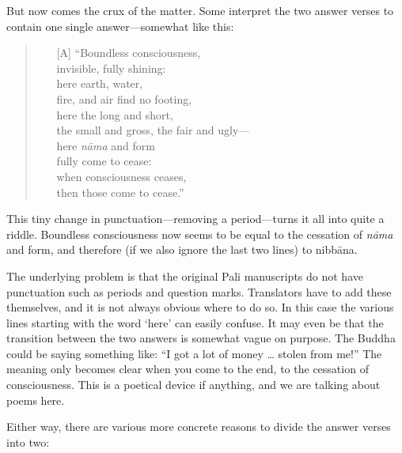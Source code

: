 \documentclass[10pt, openright]{book}
\begin{document}
\vspace* {1em}\noindent
But now comes the crux of the matter. Some interpret the two answer verses to contain one single answer—somewhat like this:


\begin{quote}


\begin{itemize}

\item[{[A]}]“Boundless consciousness, \\ invisible, fully shining: \\ here earth, water, \\ fire, and air find no footing, \\ here the long and short, \\ the small and gross, the fair and ugly— \\ here \textit{nāma} and form \\ fully come to cease: \\ when consciousness ceases, \\ then those come to cease.”

\end{itemize}

\end{quote}
This tiny change in punctuation—removing a period—turns it all into quite a riddle. Boundless consciousness now seems to be equal to the cessation of \textit{nāma} and form, and therefore (if we also ignore the last two lines) to nibbāna.


The underlying problem is that the original Pali manuscripts do not have punctuation such as periods and question marks. Translators have to add these themselves, and it is not always obvious where to do so. In this case the various lines starting with the word ‘here’ can easily confuse. It may even be that the transition between the two answers is somewhat vague on purpose. The Buddha could be saying something like: “I got a lot of money … stolen from me!” The meaning only becomes clear when you come to the end, to the cessation of consciousness. This is a poetical device if anything, and we are talking about poems here.


Either way, there are various more concrete reasons to divide the answer verses into two:
\end{document}
